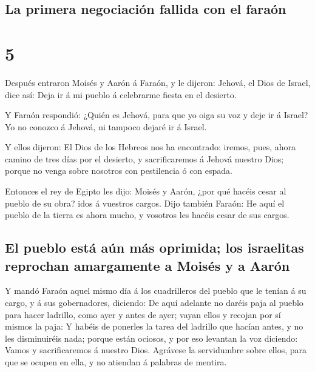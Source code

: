 \hypertarget{la-primera-negociaciuxf3n-fallida-con-el-farauxf3n}{%
\subsection{La primera negociación fallida con el
faraón}\label{la-primera-negociaciuxf3n-fallida-con-el-farauxf3n}}

\hypertarget{section-02-5}{%
\section{5}\label{section-02-5}}

 Después entraron Moisés y Aarón á Faraón, y le dijeron:
Jehová, el Dios de Israel, dice así: Deja ir á mi pueblo á celebrarme
fiesta en el desierto.

 Y Faraón respondió: ¿Quién es Jehová, para que yo oiga su
voz y deje ir á Israel? Yo no conozco á Jehová, ni tampoco dejaré ir á
Israel.

 Y ellos dijeron: El Dios de los Hebreos nos ha
encontrado: iremos, pues, ahora camino de tres días por el desierto, y
sacrificaremos á Jehová nuestro Dios; porque no venga sobre nosotros con
pestilencia ó con espada.

 Entonces el rey de Egipto les dijo: Moisés y Aarón, ¿por
qué hacéis cesar al pueblo de su obra? idos á vuestros cargos.
 Dijo también Faraón: He aquí el pueblo de la tierra es
ahora mucho, y vosotros les hacéis cesar de sus cargos.

\hypertarget{el-pueblo-estuxe1-auxfan-muxe1s-oprimida-los-israelitas-reprochan-amargamente-a-moisuxe9s-y-a-aaruxf3n}{%
\subsection{El pueblo está aún más oprimida; los israelitas reprochan
amargamente a Moisés y a
Aarón}\label{el-pueblo-estuxe1-auxfan-muxe1s-oprimida-los-israelitas-reprochan-amargamente-a-moisuxe9s-y-a-aaruxf3n}}

 Y mandó Faraón aquel mismo día á los cuadrilleros del
pueblo que le tenían á su cargo, y á sus gobernadores, diciendo:
 De aquí adelante no daréis paja al pueblo para hacer
ladrillo, como ayer y antes de ayer; vayan ellos y recojan por sí mismos
la paja:  Y habéis de ponerles la tarea del ladrillo que
hacían antes, y no les disminuiréis nada; porque están ociosos, y por
eso levantan la voz diciendo: Vamos y sacrificaremos á nuestro Dios.
 Agrávese la servidumbre sobre ellos, para que se ocupen
en ella, y no atiendan á palabras de mentira.

